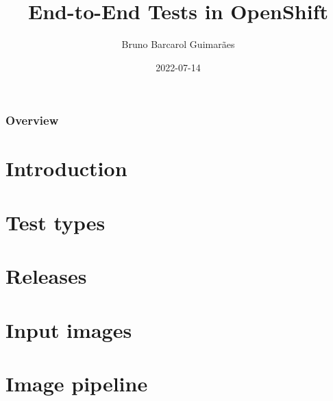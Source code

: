 \documentclass[10pt]{beamer}
\title{End-to-End Tests in OpenShift}
\author{Bruno Barcarol Guimarães}
\institute[]{Red Hat}
\date{2022-07-14}
\begin{document}
\begin{frame}
    \titlepage
\end{frame}

\begin{frame}
    \frametitle{Overview}
    \tableofcontents
\end{frame}

\section{Introduction}

\section{Test types}

\section{Releases}

\section{Input images}

\section{Image pipeline}


\begin{frame}
\end{frame}
\end{document}
